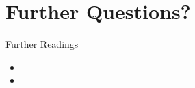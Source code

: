 




\section{Further Questions?}

\begin{frame}[t]{Further Readings}
    \begin{itemize}
        \item {}
        \item {}
    \end{itemize}

\end{frame}



